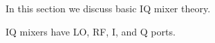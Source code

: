  \label{sec:iq_mixer:basics}

In this section we discuss basic IQ mixer theory.


IQ mixers have LO, RF, I, and Q ports.
